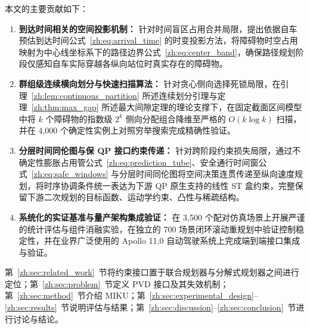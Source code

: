 本文的主要贡献如下：
\begin{enumerate}
  \item \textbf{到达时间相关的空间投影机制：} 针对时间盲区占用合并局限，提出依据自车预估到达时间公式~\ref{zh:eq:arrival_time} 的时变投影方法，将障碍物时空占用映射为中心线坐标系下的路径边界公式~\ref{zh:eq:center_band}，确保路径规划阶段仅感知自车实际穿越各纵向站位时真实存在的障碍物。
  \item \textbf{群组级连续横向划分与快速扫描算法：} 针对贪心侧向选择死锁局限，在引理~\ref{zh:lem:continuous_partition} 所述连续划分引理与定理~\ref{zh:thm:max_gap} 所述最大间隙定理的理论支撑下，在固定截面区间模型中将 $k$ 个障碍物的指数级 $2^k$ 侧向分配组合降维至严格的 $O(k\log k)$ 扫描，并在 4,000 个确定性实例上对照穷举搜索完成精确性验证。
  \item \textbf{分层时间同伦图与保 QP 接口约束传递：} 针对跨阶段约束损失局限，通过不确定性膨胀占用管公式~\ref{zh:eq:prediction_tube}、安全通行时间窗公式~\ref{zh:eq:safe_windows} 与分层时间同伦图将空间决策连贯传递至纵向速度规划，将时序协调条件统一表达为下游 QP 原生支持的线性 ST 盒约束，完整保留下游二次规划的目标函数、运动学约束、凸性与稀疏结构。
  \item \textbf{系统化的实证基准与量产架构集成验证：} 在 3,500 个配对仿真场景上开展严谨的统计评估与组件消融实验，在独立的 700 场景闭环滚动重规划中验证控制稳定性，并在业界广泛使用的 Apollo 11.0 自动驾驶系统上完成端到端接口集成与验证。
\end{enumerate}

第~\ref{zh:sec:related_work}~节将约束接口置于联合规划器与分解式规划器之间进行定位；第~\ref{zh:sec:problem}~节定义 PVD 接口及其失效机制；第~\ref{zh:sec:method}~节介绍 MIKU；第~\ref{zh:sec:experimental_design}--\ref{zh:sec:results}~节说明评估与结果；第~\ref{zh:sec:discussion}--\ref{zh:sec:conclusion}~节进行讨论与结论。
